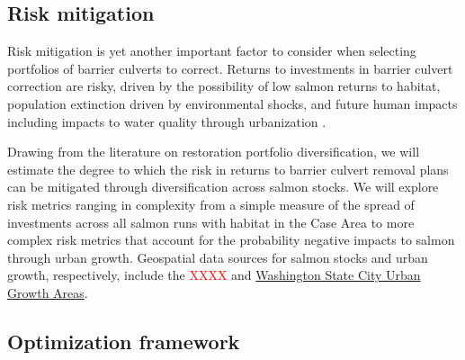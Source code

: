 \subsection*{Risk mitigation}

Risk mitigation is yet another important factor to consider when selecting portfolios of barrier culverts to correct. Returns to investments in barrier culvert correction are risky, driven by the possibility of low salmon returns to habitat, population extinction driven by environmental shocks, and future human impacts including impacts to water quality through urbanization \citep{ettinger_prioritizing_2021}. 


Drawing from the literature on restoration portfolio diversification, we will estimate the degree to which the risk in returns to barrier culvert removal plans can be mitigated through diversification across salmon stocks. We will explore risk metrics ranging in complexity from a simple measure of the spread of investments across all salmon runs with habitat in the Case Area to more complex risk metrics that account for the probability negative impacts to salmon through urban growth. Geospatial data sources for salmon stocks and urban growth, respectively, include the \textcolor{red}{XXXX} and \href{https://geo.wa.gov/datasets/wa-geoservices::washington-state-city-urban-growth-areas/about}{Washington State City Urban Growth Areas}.



\subsection*{Optimization framework \label{sec:opt}}

